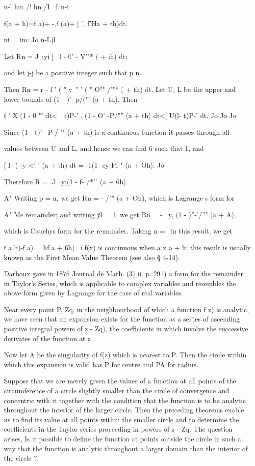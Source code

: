 {{n-l hm /! hn /I \ f\ n-i

f(a + h)=f a)+ -,f (a)+ ] ', f'Ha + th)dt.

ni = im: Jo n-L)l

Let Rn = J~iyi ] \ l - 0' - V'"* ( + ih) dt;

and let j-j be a positive integer such that p n.

%
%

Then Rn = r - f ' ( " y~" ' ( " O"" /'"* ( + th) dt. Let U, L be the
upper and lower bounds of (1 - )' -p/("' (a + th). Then

f ' X (1 - 0 "' dt<\ \ t)P-' . (1 - O' -P/"'' (a + th) dt<[ U(l- t)P-'
dt. Jo Jo Jo

Since (1 - t)' ~P / '" (a + th) is a continuous function it passes
through all

values between U and L, and hence we can find 6 such that 1, and

[ I- ) -y <' ' (a + th) dt = -1(1- ey-Pf " (a + Oh). Jo

Therefore R = .J \ y;(1 - f- /*"' (a + 6h).

A" Writing p = n, we get Rn = - /"" (a + Oh), which is Lagrange s form
for

A" Me remainder; and writing j9 = 1, we get Rn = - \, y, (1 -
)''-'/''" (a + A),

which is Cauchys form for the remainder. Taking n = \ in this result,
we get

f a h)-f a) = hf a + 6h) \ i f(x) is continuous when a x a + h; this
result is usually known as the First Mean Value Theorem (see also §
4-14).

Darboux gave in 1876 Journal de Math. (3) ii. p. 291) a form for the
remainder in Taylor's Series, which is applicable to complex variables
and resembles the above form given by Lagrange for the case of real
variables.


Near every point P, Zq, in the neighbourhood of which a function f z)
is analytic, we have seen that an expansion exists for the function as
a sei'ies of ascending positive integral powers of z - Zq), the
coefficients in which involve the successive derivates of the function
at z .

Now let A be the singularity of f(z) which is nearest to P. Then the
circle within which this expansion is valid has P for centre and PA
for radius.

Suppose that we are merely given the values of a function at all
points of the circumference of a circle slightly smaller than the
circle of convergence and concentric with it together with the
condition that the function is to be analytic throughout the interior
of the larger circle. Then the preceding theorems enable us to find
its value at all points within the smaller circle and to determine the
coefficients in the Taylor series proceeding in powers of z - Zq. The
question arises, Is it possible to define the function at points
outside the circle in such a way that the function is analytic
throughout a larger domain than the interior of the circle ?,

}}
